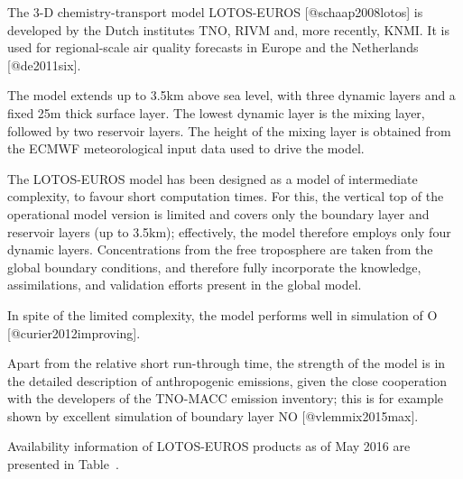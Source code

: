 \documentclass[9pt]{report}
\begin{document}
\noindent{}The 3-D chemistry-transport model LOTOS-EUROS [@schaap2008lotos] is developed by the Dutch institutes TNO, RIVM and, more recently, KNMI.
It is used for regional-scale air quality forecasts in Europe and the Netherlands [@de2011six].%

The model extends up to 3.5km above sea level, with three dynamic layers and a ﬁxed 25m thick surface layer.
The lowest dynamic layer is the mixing layer, followed by two reservoir layers.
The height of the mixing layer is obtained from the ECMWF meteorological input data used to drive the model.%

The LOTOS-EUROS model has been designed as a model of intermediate complexity, to favour short computation times.
For this, the vertical top of the operational model version is limited and covers only the boundary layer and reservoir layers (up to 3.5km); effectively, the model therefore employs only four dynamic layers.
Concentrations from the free troposphere are taken from the global boundary conditions, and therefore fully incorporate the knowledge, assimilations, and validation efforts present in the global model.%

In spite of the limited complexity, the model performs well in simulation of O [@curier2012improving].%

Apart from the relative short run-through time, the strength of the model is in the detailed description of anthropogenic emissions, given the close cooperation with the developers of the TNO-MACC emission inventory; this is for example shown by excellent simulation of boundary layer NO [@vlemmix2015max].%

Availability information of LOTOS-EUROS products as of May 2016 are presented in Table~.%
\end{document}
